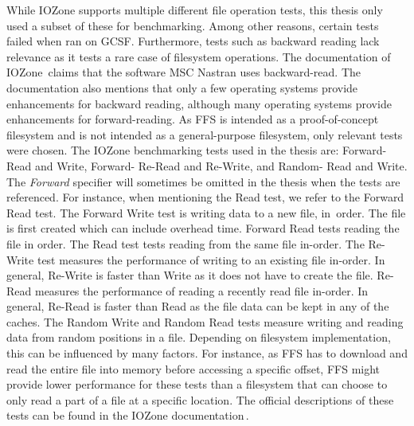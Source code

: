 While IOZone supports multiple different file operation tests, this thesis only used a subset of these for benchmarking. Among other reasons, certain tests failed when ran on \gls{GCSF}. Furthermore, tests such as backward reading lack relevance as it tests a rare case of filesystem operations. The documentation of IOZone\,\cite{iozoneIozoneFilesystemBenchmark} claims that the software MSC Nastran uses \mbox{backward-read}. The documentation also mentions that only a few operating systems provide enhancements for backward reading, although many operating systems provide enhancements for \mbox{forward-reading}. As \gls{FFS} is intended as a \mbox{proof-of-concept} filesystem and is not intended as a \mbox{general-purpose} filesystem, only relevant tests were chosen. The IOZone benchmarking tests used in the thesis are: Forward- Read and Write, Forward- \mbox{Re-Read} and \mbox{Re-Write}, and Random- Read and Write. The \textit{Forward} specifier will sometimes be omitted in the thesis when the tests are referenced. For instance, when mentioning the Read test, we refer to the Forward Read test. The Forward Write test is writing data to a new file, \mbox{in order}. The file is first created which can include overhead time. Forward Read tests reading the file in order. The Read test tests reading from the same file \mbox{in-order}. The \mbox{Re-Write} test measures the performance of writing to an existing file \mbox{in-order}. In general, \mbox{Re-Write} is faster than Write as it does not have to create the file. \mbox{Re-Read} measures the performance of reading a recently read file \mbox{in-order}. In general, \mbox{Re-Read} is faster than \mbox{Read} as the file data can be kept in any of the caches. The Random Write and Random Read tests measure writing and reading data from random positions in a file. Depending on filesystem implementation, this can be influenced by many factors. For instance, as \gls{FFS} has to download and read the entire file into memory before accessing a specific offset, \gls{FFS} might provide lower performance for these tests than a filesystem that can choose to only read a part of a file at a specific location. The official descriptions of these tests can be found in the IOZone documentation\,\cite{iozoneIozoneFilesystemBenchmark}.

